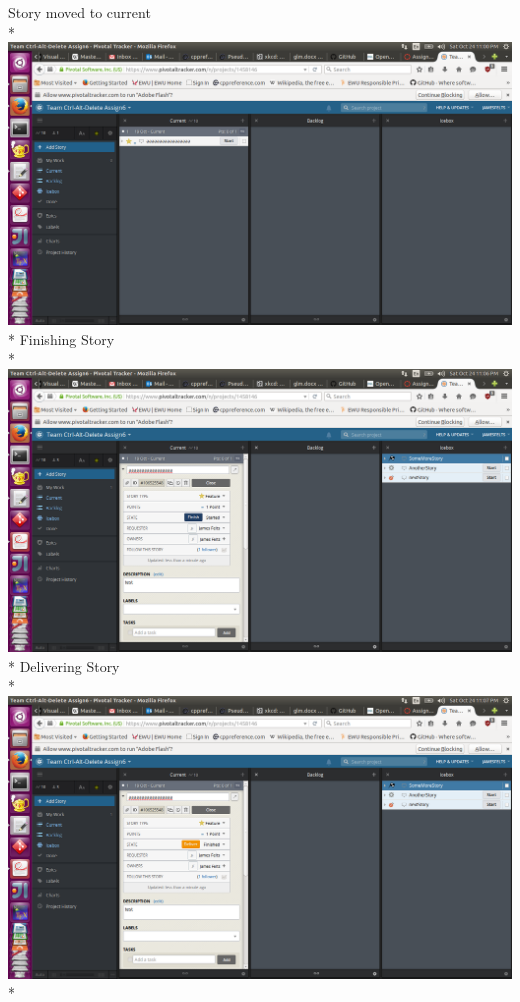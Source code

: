 \documentclass{article}
\begin{document}
Story moved to current\\*
\includegraphics[scale=.3]{Screenshot from 2015-10-24 23-00-13.png}\\*
\newpage Finishing Story\\*
\includegraphics[scale=.3]{Screenshot from 2015-10-24 23-06-36.png}\\*
Delivering Story\\*
\includegraphics[scale=.3]{Screenshot from 2015-10-24 23-07-09.png}\\*
\end{document}
